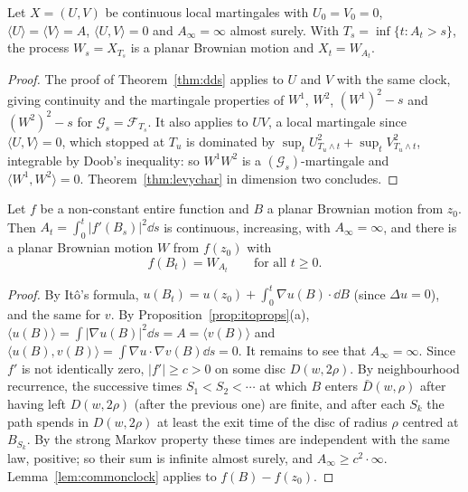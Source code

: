 \begin{lemma}\label{lem:commonclock}
Let $X=(U,V)$ be continuous local martingales with $U_0=V_0=0$, $\langle U\rangle=\langle V\rangle=A$, $\langle U,V\rangle=0$ and $A_\infty=\infty$ almost surely. With $T_s=\inf\{t:A_t>s\}$, the process $W_s=X_{T_s}$ is a
planar Brownian motion and $X_t=W_{A_t}$.
\end{lemma}

\begin{proof}
The proof of Theorem~\ref{thm:dds} applies to $U$ and $V$ with the same clock, giving continuity and the martingale properties of $W^1$, $W^2$, $(W^1)^2-s$ and $(W^2)^2-s$ for $\mathcal G_s=\mathcal F_{T_s}$. It also applies to
$UV$, a local martingale since $\langle U,V\rangle=0$, which stopped at $T_u$ is dominated by $\sup_tU_{T_u\wedge t}^2+\sup_tV_{T_u\wedge t}^2$, integrable by Doob's inequality: so $W^1W^2$ is a $(\mathcal G_s)$-martingale and
$\langle W^1,W^2\rangle=0$. Theorem~\ref{thm:levychar} in dimension two concludes.
\end{proof}

\begin{theorem}\label{thm:conformal}
Let $f$ be a non-constant entire function and $B$ a planar Brownian motion from $z_0$. Then $A_t=\int_0^t|f'(B_s)|^2\dd s$ is continuous, increasing, with $A_\infty=\infty$, and there is a planar Brownian motion $W$ from $f(z_0)$ with
\[
f(B_t)=W_{A_t}\qquad\text{for all }t\ge0.
\]
\end{theorem}

\begin{proof}
By It\^o's formula, $u(B_t)=u(z_0)+\int_0^t\nabla u(B)\cdot\dd B$ (since $\Delta u=0$), and the same for $v$. By Proposition~\ref{prop:itoprops}(a), $\langle u(B)\rangle=\int|\nabla u(B)|^2\dd s=A=\langle v(B)\rangle$ and
$\langle u(B),v(B)\rangle=\int\nabla u\cdot\nabla v(B)\dd s=0$. It remains to see that $A_\infty=\infty$. Since $f'$ is not identically zero, $|f'|\ge c>0$ on some disc $D(w,2\rho)$. By neighbourhood recurrence, the successive times
$S_1<S_2<\cdots$ at which $B$ enters $\bar D(w,\rho)$ after having left $D(w,2\rho)$ (after the previous one) are finite, and after each $S_k$ the path spends in $D(w,2\rho)$ at least the exit time of the disc of radius $\rho$ centred at
$B_{S_k}$. By the strong Markov property these times are independent with the same law, positive; so their sum is infinite almost surely, and $A_\infty\ge c^2\cdot\infty$. Lemma~\ref{lem:commonclock} applies to
$f(B)-f(z_0)$.
\end{proof}

